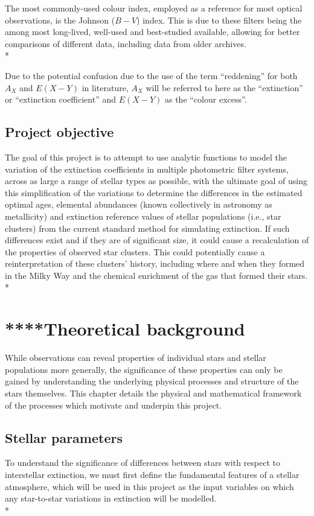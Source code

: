 \documentclass[12pt, a4paper]{report}
\begin{document}
The most commonly-used colour index, employed as a reference for most optical observations, is the Johnson ($B-V$) index. This is due to these filters being the among most long-lived, well-used and best-studied available, allowing for better comparisons of different data, including data from older archives. \\*

Due to the potential confusion due to the use of the term ``reddening'' for both $A_{X}$ and $E(X-Y)$ in literature, $A_{X}$ will be referred to here as the ``extinction'' or ``extinction coefficient'' and $E(X-Y)$ as the ``colour excess''.

\section{Project objective}
The goal of this project is to attempt to use analytic functions to model the variation of the extinction coefficients in multiple photometric filter systems, across as large a range of stellar types as possible, with the ultimate goal of using this simplification of the variations to determine the differences in the estimated optimal ages, elemental abundances (known collectively in astronomy as metallicity) and extinction reference values of stellar populations (i.e., star clusters) from the current standard method for simulating extinction. If such differences exist and if they are of significant size, it could cause a recalculation of the properties of observed star clusters. This could potentially cause a reinterpretation of these clusters' history, including where and when they formed in the Milky Way and the chemical enrichment of the gas that formed their stars. \\*



\chapter{****Theoretical background}
While observations can reveal properties of individual stars and stellar populations more generally, the significance of these properties can only be gained by understanding the underlying physical processes and structure of the stars themselves. This chapter details the physical and mathematical framework of the processes which motivate and underpin this project.

\section{Stellar parameters} \label{params}
To understand the significance of differences between stars with respect to interstellar extinction, we must first define the fundamental features of a stellar atmosphere, which will be used in this project as the input variables on which any star-to-star variations in extinction will be modelled. \\*
\end{document}
